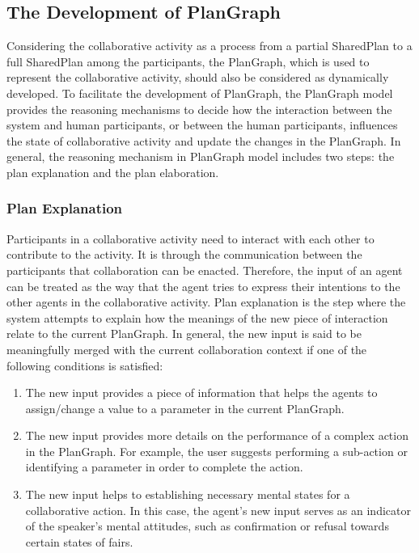 \subsection{The Development of PlanGraph} %
\label{sub:the_development_of_plangraph}





Considering the collaborative activity as a process from a partial SharedPlan to a full SharedPlan among the participants, the PlanGraph, which is used to represent the collaborative activity, should also be considered as dynamically developed. To facilitate the development of PlanGraph, the PlanGraph model provides the reasoning mechanisms to decide how the interaction between the system and human participants, or between the human participants, influences the state of collaborative activity and update the changes in the PlanGraph. In general, the reasoning mechanism in PlanGraph model includes two steps: the plan explanation and the plan elaboration.

\subsubsection*{Plan Explanation}
Participants in a collaborative activity need to interact with each other to contribute to the activity. It is through the communication between the participants that collaboration can be enacted. Therefore, the input of an agent can be treated as the way that the agent tries to express their intentions to the other agents in the collaborative activity. Plan explanation is the step where the system attempts to explain how the meanings of the new piece of interaction relate to the current PlanGraph. In general, the new input is said to be meaningfully merged with the current collaboration context if one of the following conditions is satisfied:

\begin{enumerate}
\item The new input provides a piece of information that helps the agents to assign/change a value to a parameter in the current PlanGraph. 
\item The new input provides more details on the performance of a complex action in the PlanGraph. For example, the user suggests performing a sub-action or identifying a parameter in order to complete the action.
\item The new input helps to establishing necessary mental states for a collaborative action. In this case, the agent's new input serves as an indicator of the speaker's mental attitudes, such as confirmation or refusal towards certain states of fairs. 
\end{enumerate}

